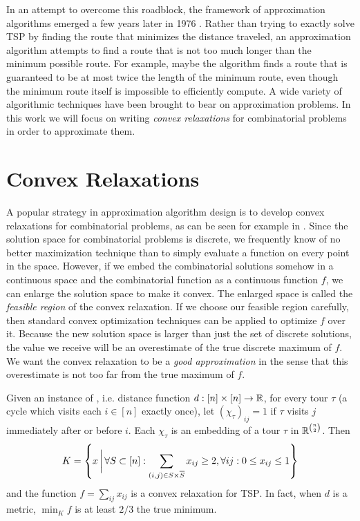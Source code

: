 In an attempt to overcome this roadblock, the framework of approximation algorithms emerged a few years later in 1976 \cite{SG76}. Rather than trying to exactly solve \textsc{TSP} by finding the route that minimizes the distance traveled, an approximation algorithm attempts to find a route that is not too much longer than the minimum possible route. For example, maybe the algorithm finds a route that is guaranteed to be at most twice the length of the minimum route, even though the minimum route itself is impossible to efficiently compute. A wide variety of algorithmic techniques have been brought to bear on approximation problems. In this work we will focus on writing \emph{convex relaxations} for combinatorial problems in order to approximate them.

\section{Convex Relaxations}
A popular strategy in approximation algorithm design is to develop convex relaxations for combinatorial problems, as can be seen for example in \cite{GW95,VY99,ARV09,Li13}.
Since the solution space for combinatorial problems is discrete, we frequently know of no better maximization technique than to simply evaluate a function on every point in the space. However, if we embed the combinatorial solutions somehow in a continuous space and the combinatorial function as a continuous function $f$, we can enlarge the solution space to make it convex. The enlarged space is called the \emph{feasible region} of the convex relaxation. If we choose our feasible region carefully, then standard convex optimization techniques can be applied to optimize $f$ over it. Because the new solution space is larger than just the set of discrete solutions, the value we receive will be an overestimate of the true discrete maximum of $f$. We want the convex relaxation to be a \emph{good approximation} in the sense that this overestimate is not too far from the true maximum of $f$.

\begin{example}
Given an instance of , i.e. distance function $d: [n] \times [n] \rightarrow \mathbb R$, for every tour $\tau$ (a cycle which visits each $i \in [n]$ exactly once), let $(\chi_\tau)_{ij} = 1$ if $\tau$ visits $j$ immediately after or before $i$. Each $\chi_\tau$ is an embedding of a tour $\tau$ in $\mathbb R^{\binom{n}{2}}$. Then
\[K = \left\{x \, \bigg{|} \, \forall S \subset [n]: \sum_{(i,j) \in S \times \overline{S}} x_{ij} \geq 2, \forall ij: 0 \leq x_{ij} \leq 1\right\}\]
and the function $f = \sum_{ij} x_{ij}$ is a convex relaxation for \textsc{TSP}. In fact, when $d$ is a metric, $\min_K f$ is at least $2/3$ the true minimum.
\end{example}

